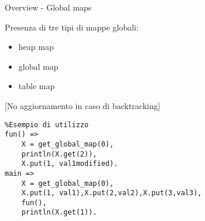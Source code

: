 \iffalse
Una della particolarità di questo linguaggio è la presenza di tre tipi di mappe globali. Tali mappe permettono di salvare dei valori e di accedervi ovunque nel codice.
La prima è la heap map, che viene costruita sullo heap. Per questo tipo di mappa in caso di predicati che prevedono il backtracking il risultato viene aggiornato
La seconda e la terza invece sono global map e la table map, che vengono create in un area di memoria globale dove picat viene lanciato. La differenza tra i due è che la table map utilizza l'hash consing, ovvero al posto di memorizzare valori uguali ne viene solamente salvato un riferimento, in modo da avere un miglioramente di prestazioni in tempo e spazio
È possibile creare differenti istanze di queste mappe globali associando ad ognuna di esse un identificativo, con il quale anche è possibile accedervi
\fi

\begin{frame}[fragile, shrink=1]{Overview - Global maps}

	Presenza di tre tipi di mappe globali:
	\begin{itemize}
		\item heap map
		\item global map 
		\item table map\hspace{0.15cm}  
	\end{itemize}
[No aggiornamento in caso di backtracking]

	\begin{lstlisting}
%Esempio di utilizzo
fun() =>
	X = get_global_map(0),
	println(X.get(2)),
	X.put(1, val1modified).
main =>
	X = get_global_map(0),
	X.put(1, val1),X.put(2,val2),X.put(3,val3),
	fun(),
	println(X.get(1)).
	\end{lstlisting}
\end{frame}